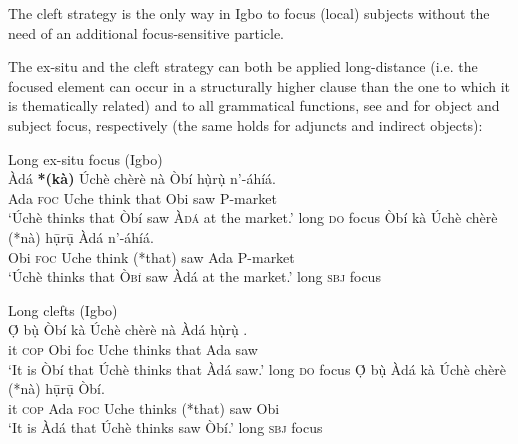 \documentclass[output=paper,colorlinks,citecolor=brown]{langscibook}
\begin{document}
The cleft strategy is the only way in Igbo to focus (local) subjects without the need of an additional focus-sensitive particle.

The ex-situ and the cleft strategy can both be applied long-distance (i.e. the focused element can occur in a structurally higher clause than the one to which it is thematically related) and to all grammatical functions, see  and  for object and subject focus, respectively (the same holds for adjuncts and indirect objects):

\ea%
    \label{ex:amaechi:7}
    Long ex-situ focus (Igbo)\\
    \ea\label{ex:amaechi:7a}
    \gll    Àdá \textbf{*(kà)} Úchè chèrè nà Òbí hụ̀rụ̀ {\longrule} n'-áhíá.\\
            Ada \textsc{foc} Uche think that Obi saw {} P-market\\
    \glt    `Úchè thinks that Òbí saw \textsc{Àdá} at the market.' \hfill{\small long \textsc{do} focus}
    \ex\label{ex:amaechi:7b}
    \gll    Òbí kà Úchè chèrè (*nà) {\longrule} hụ̄rụ̄ Àdá n'-áhíá.\\
            Obi \textsc{foc} Uche think (*that) {} saw Ada  P-market\\
    \glt    `Úchè thinks that \textsc{Òbí} saw Àdá at the market.' \hfill{\small long \textsc{sbj} focus}
    \z
\z

\ea%
    \label{ex:amaechi:8}
    Long clefts (Igbo)\\
    \ea\label{ex:amaechi:8a}
    \gll    Ọ́ bụ̀ Òbí kà Úchè chèrè nà Àdá hụ̀rụ̀ {\longrule}.\\
	        it \textsc{cop} Obi foc Uche thinks that Ada saw {}\\
    \glt    `It is Òbí that Úchè thinks that Àdá saw.' \hfill{\small long \textsc{do} focus}
    \ex\label{ex:amaechi:8b}
    \gll    Ọ́ bụ̀ Àdá kà Úchè chèrè (*nà) {\longrule} hụ̄rụ̄ Òbí.\\
	        it \textsc{cop} Ada \textsc{foc} Uche thinks (*that) {} saw Obi\\
    \glt    `It is Àdá that Úchè thinks saw Òbí.' \hfill{\small long \textsc{sbj} focus}
    \z
\z
\end{document}
